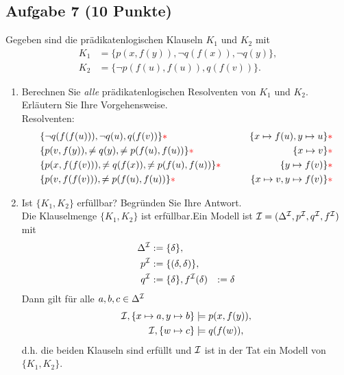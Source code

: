 \subsection*{Aufgabe 7 (10 Punkte)}
    Gegeben sind die prädikatenlogischen Klauseln $K_1$ und $K_2$ mit
    \begin{align*}
        K_1 &= \{p(x,f(y)), \neg q(f(x)), \neg q(y)\}, \\
        K_2 &= \{\neg p(f(u), f(u)), q(f(v))\}.
    \end{align*}

    \begin{enumerate}
        \item Berechnen Sie \textit{alle} prädikatenlogischen Resolventen von $K_1$ und $K_2$. Erläutern Sie Ihre Vorgehensweise. \\
        \LOES Resolventen:
        \begin{align*}
            &\{\neg q(f(f(u))), \neg q(u), q(f(v)) \}{\textcolor{red}{* }} \qquad &\{x \mapsto f(u), y \mapsto u\}{\textcolor{red}{* }} \\
            &\{p(v,f(y)), \neq q(y), \neq p(f(u),f(u)) \}{\textcolor{red}{* }} \qquad &\{x \mapsto v\}{\textcolor{red}{* }} \\
            &\{p(x,f(f(v))), \neq q(f(x)), \neq p(f(u),f(u)) \}{\textcolor{red}{* }} \qquad &\{y \mapsto f(v)\}{\textcolor{red}{* }} \\
            &\{p(v,f(f(v))), \neq p(f(u),f(u)) \}{\textcolor{red}{* }} \qquad &\{x \mapsto v, y \mapsto f(v)\}{\textcolor{red}{* }} \\
        \end{align*}

        \item Ist $\{K_1, K_2\}$ erfüllbar? Begründen Sie Ihre Antwort. \\
        \LOES Die Klauselmenge $\{K_1, K_2\}$ ist erfüllbar.\POINT Ein Modell ist $\mathcal{I} = (\Delta^{\mathcal{I}}, p^{\mathcal{I}}, q^{\mathcal{I}}, f^{\mathcal{I}})$ mit
        \begin{align*}
            \Delta^{\mathcal{I}} &:= \{\delta\}, \\
            p^{\mathcal{I}} &:= \{(\delta,\delta)\}, \\
            q^{\mathcal{I}} &:= \{\delta\},
            f^{\mathcal{I}}(\delta) &:= \delta
        \end{align*}
        Dann gilt für alle $a,b,c \in \Delta^{\mathcal{I}}$
        \begin{align*}
            \mathcal{I}, \{x \mapsto a, y \mapsto b\} &\models p(x,f(y)),\\
            \mathcal{I}, \{w \mapsto c\} &\models q(f(w)),
        \end{align*}
        d.h. die beiden Klauseln sind erfüllt und $\mathcal{I}$ ist in der Tat ein Modell von $\{K_1, K_2\}$.\POINT
    \end{enumerate}

